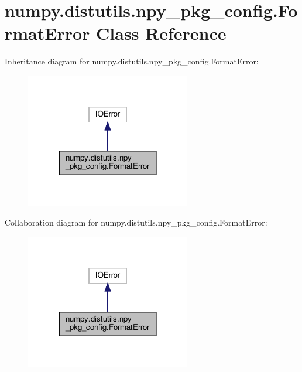 \hypertarget{classnumpy_1_1distutils_1_1npy__pkg__config_1_1FormatError}{}\section{numpy.\+distutils.\+npy\+\_\+pkg\+\_\+config.\+Format\+Error Class Reference}
\label{classnumpy_1_1distutils_1_1npy__pkg__config_1_1FormatError}


Inheritance diagram for numpy.\+distutils.\+npy\+\_\+pkg\+\_\+config.\+Format\+Error\+:
\nopagebreak
\begin{figure}[H]
\begin{center}
\leavevmode
\includegraphics[width=204pt]{classnumpy_1_1distutils_1_1npy__pkg__config_1_1FormatError__inherit__graph}
\end{center}
\end{figure}


Collaboration diagram for numpy.\+distutils.\+npy\+\_\+pkg\+\_\+config.\+Format\+Error\+:
\nopagebreak
\begin{figure}[H]
\begin{center}
\leavevmode
\includegraphics[width=204pt]{classnumpy_1_1distutils_1_1npy__pkg__config_1_1FormatError__coll__graph}
\end{center}
\end{figure}
